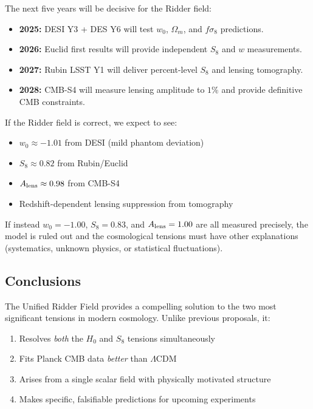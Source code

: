 \documentclass[twocolumn,showpacs,preprintnumbers,amsmath,amssymb,prd]{revtex4-2}
\begin{document}
The next five years will be decisive for the Ridder field:

\begin{itemize}
    \item \textbf{2025:} DESI Y3 + DES Y6 will test $w_0$, $\Omega_m$, and $f\sigma_8$ predictions.
    \item \textbf{2026:} Euclid first results will provide independent $S_8$ and $w$ measurements.
    \item \textbf{2027:} Rubin LSST Y1 will deliver percent-level $S_8$ and lensing tomography.
    \item \textbf{2028:} CMB-S4 will measure lensing amplitude to $1\%$ and provide definitive CMB constraints.
\end{itemize}

If the Ridder field is correct, we expect to see:
\begin{itemize}
    \item $w_0 \approx -1.01$ from DESI (mild phantom deviation)
    \item $S_8 \approx 0.82$ from Rubin/Euclid
    \item $A_{\rm lens} \approx 0.98$ from CMB-S4
    \item Redshift-dependent lensing suppression from tomography
\end{itemize}

If instead $w_0 = -1.00$, $S_8 = 0.83$, and $A_{\rm lens} = 1.00$ are all measured precisely, the model is ruled out and the cosmological tensions must have other explanations (systematics, unknown physics, or statistical fluctuations).

\subsection{Conclusions}

The Unified Ridder Field provides a compelling solution to the two most significant tensions in modern cosmology. Unlike previous proposals, it:

\begin{enumerate}
    \item Resolves \textit{both} the $H_0$ and $S_8$ tensions simultaneously
    \item Fits Planck CMB data \textit{better} than $\Lambda$CDM
    \item Arises from a single scalar field with physically motivated structure
    \item Makes specific, falsifiable predictions for upcoming experiments
\end{enumerate}
\end{document}

